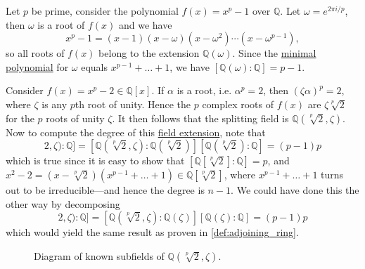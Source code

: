   \begin{example}
    \label{ex:splitting-field-of-xp1}
    Let $p$ be prime, consider the polynomial $f(x) = x^p - 1$ over $\mathbb{Q}$. Let $\omega = e^{2\pi i/p}$, then $\omega$ is a root of $f(x)$ and we have
    \begin{equation}
      x^p - 1 = (x - 1)(x - \omega)(x - \omega^2)\cdots(x - \omega^{p-1}),
    \end{equation}
    so all roots of $f(x)$ belong to the extension $\mathbb{Q}(\omega)$. Since the \hyperref[def:min_poly]{minimal polynomial} for $\omega$ equals $x^{p-1} + \ldots + 1$, we have $[\mathbb{Q}(\omega) : \mathbb{Q}] = p - 1$.
  \end{example}

  \begin{example}
    \label{ex:splitting-field-of-xp2-p-prime}
    Consider $f(x) = x^p - 2 \in \mathbb{Q}[x]$. If $\alpha$ is a root, i.e. $\alpha^p = 2$, then $(\zeta \alpha)^p = 2$, where $\zeta$ is any $p$th root of unity. Hence the $p$ complex roots of $f(x)$ are $\zeta \sqrt[p]{2}$ for the $p$ roots of unity $\zeta$. It then follows that the splitting field is $\mathbb{Q}(\sqrt[p]{2}, \zeta)$. Now to compute the degree of this \hyperref[def:field-extension]{field extension}, note that
    \begin{equation}
      [\mathbb{Q}(\sqrt[p]{2}, \zeta): \mathbb{Q}] = [\mathbb{Q}(\sqrt[p]{2}, \zeta): \mathbb{Q}(\sqrt[p]{2})] [\mathbb{Q}(\sqrt[p]{2}): \mathbb{Q}] = (p - 1) p
    \end{equation}
    which is true since it is easy to show that $[\mathbb{Q}[\sqrt[p]{2}]: \mathbb{Q}] =  p$, and $x^2 - 2 = (x - \sqrt[p]{2}) (x^{p-1} + \ldots + 1) \in \mathbb{Q}[\sqrt[p]{2}]$, where $x^{p-1} + \ldots + 1$ turns out to be irreducible---and hence the degree is $n-1$. We could have done this the other way by decomposing 
    \begin{equation}
      [\mathbb{Q}(\sqrt[p]{2}, \zeta): \mathbb{Q}] = [\mathbb{Q}(\sqrt[p]{2}, \zeta): \mathbb{Q}(\zeta)] [\mathbb{Q}(\zeta): \mathbb{Q}] = (p - 1) p
    \end{equation}
    which would yield the same result as proven in \ref{def:adjoining_ring}.

    \begin{figure}[H]
      \centering 
      \caption{Diagram of known subfields of $\mathbb{Q}(\sqrt[p]{2}, \zeta)$. } 
      \label{fig:splittingfieldx_2}
    \end{figure}
  \end{example}

